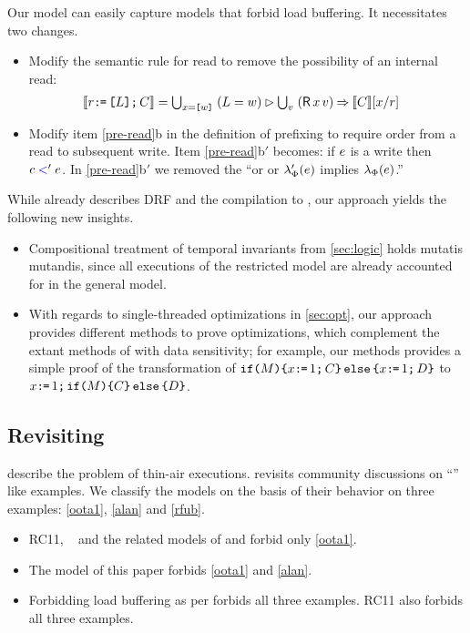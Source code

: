 Our model can easily capture models that forbid load buffering.  It
necessitates two changes.
\begin{itemize}
\item Modify the semantic rule for read to remove the possibility of an
  internal read:
  \begin{align*}
    \sem{\aReg\GETS\REF{\cExp}\SEMI \aCmd} & =
    \textstyle\bigcup_{\aLoc=\REF{\bVal}}\; ({\cExp}=\bVal) \guard \textstyle\bigcup_\aVal\; (\DR\aLoc\aVal) \prefix \sem{\aCmd}[\aLoc/\aReg] 
  \end{align*}
\item Modify item \ref{pre-read}b in the definition of prefixing to require
  order from a read to subsequent write.  Item \ref{pre-read}b$'$ becomes: if
  $e$ is a write then $c\mathrel{{\color{blue}<}}'e$.  In \ref{pre-read}b$'$ we removed
  the ``or or $\lambda_{\Phi}'(e)$ implies $\lambda_{\Phi}(e)$.''
\end{itemize}

While \citet{Dolan:2018:BDR:3192366.3192421} already describes DRF and the
compilation to \armeight, our approach yields the following new insights.
\begin{itemize}
\item Compositional treatment of temporal invariants
  from \textsection\ref{sec:logic} holds mutatis mutandis, since all
  executions of the restricted model are already accounted for in the general
  model.

\item With regards to single-threaded optimizations in
  \textsection\ref{sec:opt}, our approach provides different methods to prove
  optimizations, which complement the extant methods of
  \citet{Dolan:2018:BDR:3192366.3192421} with data sensitivity; for example,
  our methods provides a simple proof of the transformation of
  $\texttt{if}\allowbreak\texttt{(}M\texttt{)}\allowbreak\texttt{\{} x \texttt{:}\mkern-1mu\texttt{=}\, 1 \texttt{;}\, C \texttt{\}}\,\allowbreak\texttt{else}\allowbreak\,\texttt{\{} x\texttt{:}\mkern-1mu\texttt{=}\, 1 \texttt{;}\, D\texttt{\}}$ to
  $x \texttt{:}\mkern-1mu\texttt{=}\, 1 \texttt{;}\, \texttt{if}\allowbreak\texttt{(}M\texttt{)}\allowbreak\texttt{\{} C \texttt{\}}\,\allowbreak\texttt{else}\allowbreak\,\texttt{\{} D\texttt{\}}$.

\end{itemize}

\subsection{Revisiting \oota}
\citet{DBLP:conf/esop/BattyMNPS15} describe the problem of thin-air
executions. \citet{BoehmOOTA} revisits community discussions on ``\oota''
like examples.  We classify the models on the basis of their behavior on
three examples: \eqref{oota1}, \eqref{alan} and \eqref{rfub}.
\begin{itemize}
\item RC11\cite{DBLP:conf/pldi/LahavVKHD17}, \jmm\ 
  \cite{Manson:2005:JMM:1047659.1040336} and the related models of
  \citet{DBLP:conf/esop/JagadeesanPR10} and \citet{DBLP:conf/popl/KangHLVD17}
  forbid only \eqref{oota1}.
\item The model of this paper forbids \eqref{oota1} and \eqref{alan}.
\item Forbidding load buffering as per
  \citep{Dolan:2018:BDR:3192366.3192421,BoehmOOTA} forbids all three
  examples.  RC11\cite{DBLP:conf/pldi/LahavVKHD17} also forbids all three
  examples.
\end{itemize}

